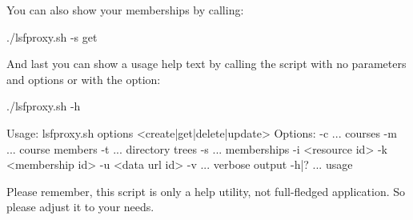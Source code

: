 You can also show your memberships by calling:
\begin{code}
  ./lsfproxy.sh -s get
\end{code}

And last you can show a usage help text by calling the script with no
parameters and options or with the  option:
\begin{code}
  ./lsfproxy.sh -h

  Usage: lsfproxy.sh options <create|get|delete|update>
  Options:
    -c ... courses
    -m ... course members
    -t ... directory trees
    -s ... memberships
    -i <resource id>
    -k <membership id>
    -u <data url id>
    -v   ... verbose output
    -h|? ... usage
\end{code}
Please remember, this script is only a help utility, not full-fledged
application. So please adjust it to your needs. 

